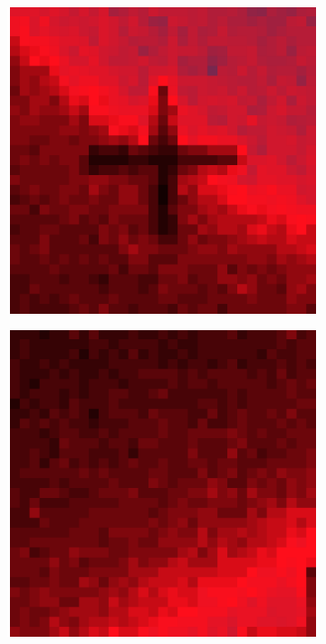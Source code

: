 \documentclass[10pt]{scrartcl}
\begin{document}
\begin{figure}[!ht]
    \begin{subfigure}[b]{.3\linewidth}
        \centering
        \includegraphics[width=1.2\linewidth]{../plots_tables_images/1d1dcrop_1_1.eps}
    \end{subfigure}
    \begin{subfigure}[b]{.3\linewidth}
        \centering
        \includegraphics[width=1.2\linewidth]{../plots_tables_images/1d1dcrop_1_9.eps}

\end{subfigure}
\end{figure}
\end{document}
